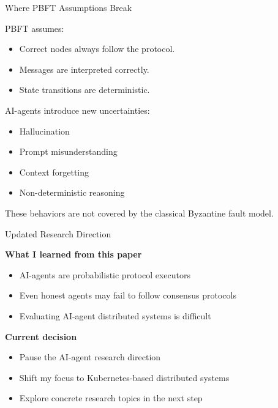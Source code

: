 \documentclass{beamer}
\begin{document}
\begin{frame}{Where PBFT Assumptions Break}

PBFT assumes:

\begin{itemize}
    \item Correct nodes always follow the protocol.
    \item Messages are interpreted correctly.
    \item State transitions are deterministic.
\end{itemize}

\vspace{0.4cm}

AI-agents introduce new uncertainties:

\begin{itemize}
    \item Hallucination
    \item Prompt misunderstanding
    \item Context forgetting
    \item Non-deterministic reasoning
\end{itemize}

\vspace{0.4cm}

These behaviors are not covered by the classical Byzantine fault model.

\end{frame}

\begin{frame}{Updated Research Direction}

\textbf{What I learned from this paper}

\begin{itemize}
    \item AI-agents are probabilistic protocol executors
    \item Even honest agents may fail to follow consensus protocols
    \item Evaluating AI-agent distributed systems is difficult
\end{itemize}

\vspace{0.4cm}

\textbf{Current decision}

\begin{itemize}
    \item Pause the AI-agent research direction
    \item Shift my focus to Kubernetes-based distributed systems
    \item Explore concrete research topics in the next step
\end{itemize}

\end{frame}
\end{document}
